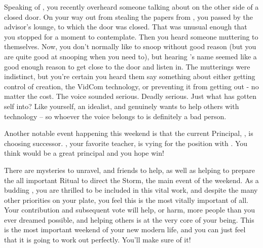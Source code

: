 \documentclass[char]{GL2020}
\begin{document}
Speaking of \cTechStar{}, you recently overheard someone talking about  \cTechStar{\them} on the other side of a closed door. On your way out from stealing the papers from \cBunker{}, you passed by the advisor's lounge, to which the door was closed. That was unusual enough that you stopped for a moment to contemplate. Then you heard someone muttering to themselves. Now, you don't normally like to snoop without good reason (but you are quite good at snooping when you need to), but hearing \cTechStar{}'s name seemed like a good enough reason to get close to the door and listen in. The mutterings were indistinct, but you're certain you heard them say something about either getting control of \cTechStar{\their} creation, the VidCom technology, or preventing it from getting out - no matter the cost. The voice sounded serious. Deadly serious. Just what has \cTechStar{\they} gotten \cTechStar{\their}self into? Like yourself, \cTechStar{\they} \cTechStar{\are} an idealist, and genuinely wants to help others with \cTechStar{\their} technology – so whoever the voice belongs to is definitely a bad person.

Another notable event happening this weekend is that the current Principal, \cPrincipal{\full}, is choosing \cPrincipal{\their} successor. \cMusic{\full}, your favorite teacher, is vying for the position with \cBeetle{\full}. You think \cMusic{} would be a great principal and you hope \cMusic{\they} win\cMusic{\plural}!

There are mysteries to unravel, and friends to help, as well as helping to prepare the all important Ritual to direct the Storm, the main event of the weekend.  As a budding \cDisney{\cleric}, you are thrilled to be included in this vital work, and despite the many other priorities on your plate, you feel this is the most vitally important of all. Your contribution and subsequent vote will help, or harm, more people than you ever dreamed possible, and helping others is at the very core of your being. This is the most important weekend of your new modern life, and you can just feel that it is going to work out perfectly. You'll make sure of it!
\end{document}
